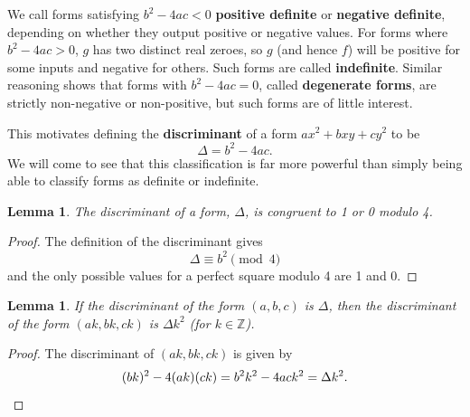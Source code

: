 \documentclass[honours,12pt]{unswthesis}
\newcommand{\Z}{\mathbb{Z}} %
\newtheorem{lemma}[theorem]{Lemma}
\numberwithin{equation}{section}
\begin{document}
We call forms satisfying $b^2 -4ac < 0$ \textbf{positive definite} or \textbf{negative definite}, depending on whether they output positive or negative values.
For forms where $b^2 - 4ac > 0$, $g$ has two distinct real zeroes, so $g$ (and hence $f$) will be positive for some inputs and negative for others.
Such forms are called \textbf{indefinite}.
Similar reasoning shows that forms with $b^2 -4ac = 0$, called \textbf{degenerate forms}, are strictly non-negative or non-positive, but such forms are of little interest.

This motivates defining the \textbf{discriminant} of a form $ax^2 + bxy + cy^2$ to be 
$$\Delta = b^2 - 4ac.$$
We will come to see that this classification is far more powerful than simply being able to classify forms as definite or indefinite.

\pagebreak
\begin{lemma}
    The discriminant of a form, $\Delta$, is congruent to 1 or 0 modulo 4. 
\end{lemma}

\begin{proof}
    The definition of the discriminant gives
    $$\Delta \equiv b^2 \pmod{4}$$
    and the only possible values for a perfect square modulo 4 are 1 and 0.
\end{proof}

\begin{lemma}\label{lemma-discriminant-under-multiple}
    If the discriminant of the form $(a, b, c)$ is $\Delta$, then the discriminant of the form $(ak, bk, ck)$ is $\Delta k^2$ (for $k \in \Z$).
\end{lemma}

\begin{proof}
    The discriminant of $(ak, bk, ck)$ is given by
    \[ (bk)^2 - 4(ak)(ck) = b^2k^2 - 4ack^2 = \Delta k^2. \qedhere \]
\end{proof}
\end{document}
